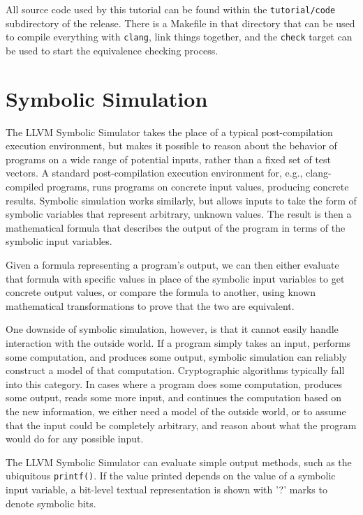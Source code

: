 \documentclass[11pt]{article}
\begin{document}
All source code used by this tutorial can be found within the
\texttt{tutorial/code} subdirectory of the release.  There is a Makefile
in that directory that can be used to compile everything with
\texttt{clang}, link things together, and the \texttt{check} target can
be used to start the equivalence checking process.

\section{Symbolic Simulation}

The LLVM Symbolic Simulator takes the place of a typical
post-compilation execution environment, but makes it possible to reason
about the behavior of programs on a wide range of potential inputs,
rather than a fixed set of test vectors. A standard post-compilation
execution environment for, e.g., clang-compiled programs, runs programs
on concrete input values, producing concrete results. Symbolic
simulation works similarly, but allows inputs to take the form of
symbolic variables that represent arbitrary, unknown values. The result
is then a mathematical formula that describes the output of the program
in terms of the symbolic input variables.

Given a formula representing a program's output, we can then either
evaluate that formula with specific values in place of the symbolic
input variables to get concrete output values, or compare the formula to
another, using known mathematical transformations to prove that the two
are equivalent.

One downside of symbolic simulation, however, is that it cannot easily
handle interaction with the outside world. If a program simply takes an
input, performs some computation, and produces some output, symbolic
simulation can reliably construct a model of that computation.
Cryptographic algorithms typically fall into this category. In cases
where a program does some computation, produces some output, reads some
more input, and continues the computation based on the new information,
we either need a model of the outside world, or to assume that the input
could be completely arbitrary, and reason about what the program would
do for any possible input.

The LLVM Symbolic Simulator can evaluate simple output methods, such as
the ubiquitous \texttt{printf()}.  If the value printed depends on the
value of a symbolic input variable, a bit-level textual representation
is shown with '?' marks to denote symbolic bits.
\end{document}
